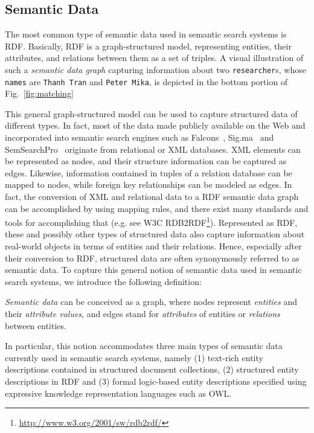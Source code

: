 \subsection{Semantic Data}  The most common type of semantic data used in semantic search systems is RDF. Basically, RDF is a graph-structured model, representing entities, their attributes, and relations between them as a set of triples. A visual illustration of such a \emph{semantic data graph} capturing information about two \verb+researcher+s, whose \verb+names+ are \verb+Thanh Tran+ and \verb+Peter Mika+, is depicted in the bottom portion of Fig.~\ref{fig:matching} 

This general graph-structured model can be used to capture structured data of different types. In fact, most of the data made publicly available on the Web and incorporated into semantic search engines such as Falcons~\cite{DBLP:journals/ijswis/ChengQ09}, Sig.ma~\cite{DBLP:journals/ws/TummarelloCCDDD10} and SemSearchPro~\cite{DBLP:journals/ws/TranHL11} originate from relational or XML databases. XML elements can be represented as nodes, and their structure information can be captured as edges. Likewise, information contained in tuples of a relation database can be mapped to nodes, while foreign key relationships can be modeled as edges. In fact, the conversion of XML and relational data to a RDF semantic data graph can be accomplished by using mapping rules, and there exist many standards and tools for accomplishing that (e.g. see W3C RDB2RDF\footnote{\url{http://www.w3.org/2001/sw/rdb2rdf/}}). Represented as RDF, these and possibly other types of structured data also capture information about real-world objects in terms of entities and their relations. Hence, especially after their conversion to RDF, structured data are often synonymously referred to as semantic data. To capture this general notion of semantic data used in semantic search systems, we introduce the following definition: 

\begin{definition}
\emph{Semantic data} can be conceived as a graph, where nodes represent \emph{entities} and their \emph{attribute values}, and edges stand for \emph{attributes} of entities or \emph{relations} between entities. 
\end{definition}

In particular, this notion accommodates three main types of semantic data currently used in semantic search systems, namely (1) text-rich entity descriptions contained in structured document collections, (2) structured entity descriptions in RDF and (3) formal logic-based entity descriptions specified using expressive knowledge representation languages such as OWL. 

